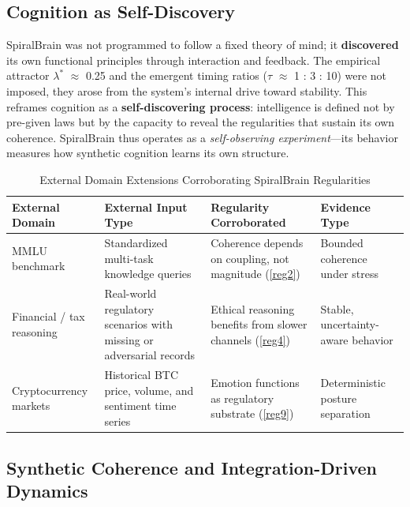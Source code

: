 \documentclass[11pt,a4paper]{article}
\begin{document}
\subsection{Cognition as Self-Discovery}

SpiralBrain was not programmed to follow a fixed theory of mind; it \textbf{discovered} its own functional principles through interaction and feedback.
The empirical attractor $\lambda^*$ $\approx$ 0.25 and the emergent timing ratios ($\tau$ $\approx$ 1 : 3 : 10) were not imposed, they arose from the system's internal drive toward stability.
This reframes cognition as a \textbf{self-discovering process}: intelligence is defined not by pre-given laws but by the capacity to reveal the regularities that sustain its own coherence.
SpiralBrain thus operates as a \textit{self-observing experiment}---its behavior measures how synthetic cognition learns its own structure.

\begin{table}[H]
\centering
\caption{External Domain Extensions Corroborating SpiralBrain Regularities \cite{mmlu_cognitive_integrity}}
\label{tab:extensions}
\renewcommand{\arraystretch}{1.3}
\begin{tabular}{L{3cm} L{4cm} L{4cm} L{3cm}}
\toprule
External Domain &
External Input Type &
Regularity Corroborated &
Evidence Type \\
\midrule
MMLU benchmark
& Standardized multi-task knowledge queries
& Coherence depends on coupling, not magnitude (\ref{reg2})
& Bounded coherence under stress \cite{mmlu_cognitive_integrity} \\

Financial / tax reasoning
& Real-world regulatory scenarios with missing or adversarial records
& Ethical reasoning benefits from slower channels (\ref{reg4})
& Stable, uncertainty-aware behavior \cite{Cragin2026Finance} \\

Cryptocurrency markets
& Historical BTC price, volume, and sentiment time series
& Emotion functions as regulatory substrate (\ref{reg9})
& Deterministic posture separation \cite{emotion_conditioned_risk_posture} \\

\bottomrule
\end{tabular}
\end{table}

\subsection{Synthetic Coherence and Integration-Driven Dynamics}
\end{document}

